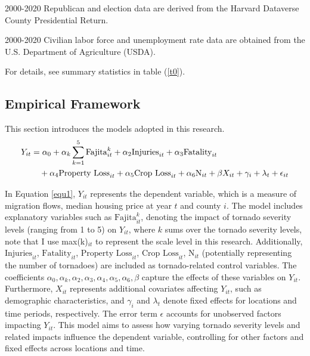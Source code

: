 \documentclass[letterpaper]{article}
\begin{document}
2000-2020 Republican and election data are derived from the Harvard Dataverse County Presidential Return.

2000-2020 Civilian labor force and unemployment rate data are obtained from the U.S. Department of Agriculture
(USDA). 

For details, see summary statistics in table (\ref{t0}).


\subsection{Empirical Framework}
This section introduces the models adopted in this research. 
\begin{align}
\label{equ1}
  \large Y_{it} &= \alpha_0 + \alpha_k \sum_{k=1}^{5} \text{Fajita}_{it}^{k} + \alpha_2 \text{Injuries}_{it} + \alpha_3 \text{Fatality}_{it} \nonumber \\
           &\quad + \alpha_4 \text{Property Loss}_{it} + \alpha_5 \text{Crop Loss}_{it} + \alpha_6 \text{N}_{it} + \beta X_{it} + \gamma_i + \lambda_t + \epsilon_{it}
\end{align}


In Equation \ref{equ1}, \( Y_{it} \) represents the dependent variable, which is a measure of migration flows, median housing price at year \( t \) and county \( i \). The model includes explanatory variables such as \( \text{Fajita}_{it}^{k} \), denoting the impact of tornado severity levels (ranging from 1 to 5) on \( Y_{it} \), where \( k \) sums over the tornado severity levels, note that I use max(k)$_{it}$ to represent the scale level in this research. Additionally, \( \text{Injuries}_{it} \), \( \text{Fatality}_{it} \), \( \text{Property Loss}_{it} \), \( \text{Crop Loss}_{it} \), \( \text{N}_{it} \) (potentially representing the number of tornadoes) are included as tornado-related control variables. The coefficients \( \alpha_0, \alpha_k, \alpha_2, \alpha_3, \alpha_4, \alpha_5, \alpha_6, \beta \) capture the effects of these variables on \( Y_{it} \). Furthermore, \( X_{it} \) represents additional covariates affecting \( Y_{it} \), such as demographic characteristics, and \( \gamma_i \) and \( \lambda_t \) denote fixed effects for locations and time periods, respectively. The error term \( \epsilon \) accounts for unobserved factors impacting \( Y_{it} \). This model aims to assess how varying tornado severity levels and related impacts influence the dependent variable, controlling for other factors and fixed effects across locations and time.
\end{document}

